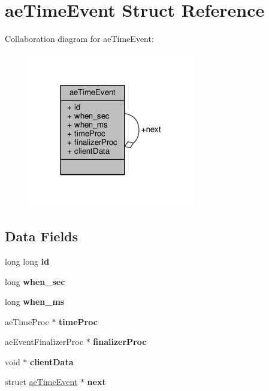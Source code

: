 \hypertarget{structaeTimeEvent}{}\section{ae\+Time\+Event Struct Reference}
\label{structaeTimeEvent}


Collaboration diagram for ae\+Time\+Event\+:\nopagebreak
\begin{figure}[H]
\begin{center}
\leavevmode
\includegraphics[width=206pt]{structaeTimeEvent__coll__graph}
\end{center}
\end{figure}
\subsection*{Data Fields}
\begin{DoxyCompactItemize}
\item 
\mbox{\label{structaeTimeEvent_a24ed4bf76ef40a2c735e9f9cccb45de4}} 
long long {\bfseries id}
\item 
\mbox{\label{structaeTimeEvent_a8b8006c68e6af8e1565eda7cbe0ed222}} 
long {\bfseries when\+\_\+sec}
\item 
\mbox{\label{structaeTimeEvent_aa1c543dc2cfc4d17cf3153c78f373635}} 
long {\bfseries when\+\_\+ms}
\item 
\mbox{\label{structaeTimeEvent_a149629cdd2633c73cfb56e4570bb43ac}} 
ae\+Time\+Proc $\ast$ {\bfseries time\+Proc}
\item 
\mbox{\label{structaeTimeEvent_abc682a846c909d98ed1656170bb360f2}} 
ae\+Event\+Finalizer\+Proc $\ast$ {\bfseries finalizer\+Proc}
\item 
\mbox{\label{structaeTimeEvent_ad31bed95bafc0baa81fe645f56a11503}} 
void $\ast$ {\bfseries client\+Data}
\item 
\mbox{\label{structaeTimeEvent_a9721fa6e2866701e2c38f0020beaac60}} 
struct \hyperlink{structaeTimeEvent}{ae\+Time\+Event} $\ast$ {\bfseries next}
\end{DoxyCompactItemize}


